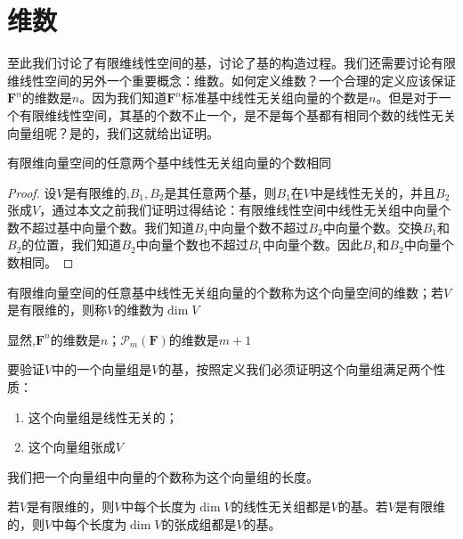 \documentclass[10pt,a4paper,UTF8]{article}
\begin{document}
\section{维数}
\label{sec:orgheadline4}


至此我们讨论了有限维线性空间的基，讨论了基的构造过程。我们还需要讨论有限维线性空间的另外一个重要概念：维数。如何定义维数？一个合理的定义应该保证\(\mathbf{F}^{n}\)的维数是\(n\)。因为我们知道\(\mathbf{F}^{n}\)标准基中线性无关组向量的个数是\(n\)。但是对于一个有限维线性空间，其基的个数不止一个，是不是每个基都有相同个数的线性无关向量组呢？是的，我们这就给出证明。

\begin{theorem}[基中线性无关组向量个数不依赖基的选取]
有限维向量空间的任意两个基中线性无关组向量的个数相同
\end{theorem}
\begin{proof}
设\(V\)是有限维的,\(B_{1},B_{2}\)是其任意两个基，则\(B_{1}\)在\(V\)中是线性无关的，并且\(B_{2}\)张成\(V\)，通过本文之前我们证明过得结论：有限维线性空间中线性无关组中向量个数不超过基中向量个数。我们知道\(B_{1}\)中向量个数不超过\(B_{2}\)中向量个数。交换\(B_{1}\)和\(B_{2}\)的位置，我们知道\(B_{2}\)中向量个数也不超过\(B_{1}\)中向量个数。因此\(B_{1}\)和\(B_{2}\)中向量个数相同。
\end{proof}
\begin{definition}
有限维向量空间的任意基中线性无关组向量的个数称为这个向量空间的维数；若\(V\)是有限维的，则称\(V\)的维数为\(\dim V\)
\end{definition}
显然,\(\mathbf{F}^{n}\)的维数是\(n\)；\(\mathcal{P}_{m}(\mathbf{F})\)的维数是\(m+1\)

要验证\(V\)中的一个向量组是\(V\)的基，按照定义我们必须证明这个向量组满足两个性质：
\begin{enumerate}
\item 这个向量组是线性无关的；
\item 这个向量组张成\(V\)
\end{enumerate}

我们把一个向量组中向量的个数称为这个向量组的长度。

\begin{theorem}
若\(V\)是有限维的，则\(V\)中每个长度为\(\dim V\)的线性无关组都是\(V\)的基。若\(V\)是有限维的，则\(V\)中每个长度为\(\dim V\)的张成组都是\(V\)的基。
\end{theorem}
\end{document}
